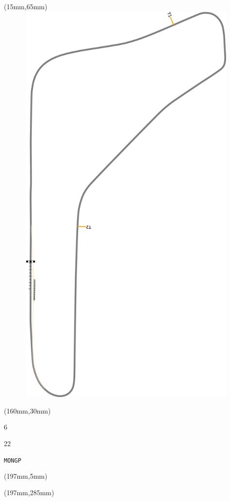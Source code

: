 \begin{textblock*}{185mm}(15mm,65mm)%
\centering
\mbox{\includegraphics[width=185mm,height=210mm,keepaspectratio]{PT/MONGP.pdf}}
\end{textblock*}
\begin{textblock*}{40mm}(160mm,30mm)%
\Large
\par{} 
\par6 
\par22 
\par\hfill\tiny\tt MONGP\\
\end{textblock*}
\begin{textblock*}{20mm}(197mm,5mm)%
\fbox{\thepage}
\label{MONGP}
\end{textblock*}
\begin{textblock*}{20mm}(197mm,285mm)%
\fbox{\thepage}
\end{textblock*}

